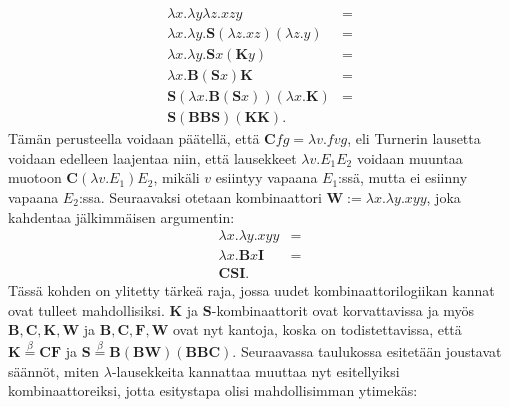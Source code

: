 \documentclass[a4paper,12pt]{amsart}
\begin{document}
\begin{equation}
\begin{split}
\lambda x.\lambda y\lambda z.xzy &= \\
\lambda x.\lambda y.\mathbf{S}(\lambda z.xz)(\lambda z.y) &= \\
\lambda x.\lambda y.\mathbf{S}x(\mathbf{K}y) &= \\
\lambda x.\mathbf{B}(\mathbf{S}x)\mathbf{K} &= \\
\mathbf{S}(\lambda x.\mathbf{B}(\mathbf{S}x))(\lambda x.\mathbf{K}) &= \\
\mathbf{S(BBS)(KK)}.
\end{split}
\end{equation}
Tämän perusteella voidaan päätellä, että $\mathbf{C}fg=\lambda v.fvg$, eli Turnerin lausetta voidaan edelleen laajentaa niin, että lausekkeet $\lambda v.E_1 E_2$ voidaan muuntaa muotoon $\mathbf{C}(\lambda v.E_1)E_2$, mikäli $v$ esiintyy vapaana $E_1$:ssä, mutta ei esiinny vapaana $E_2$:ssa. Seuraavaksi otetaan kombinaattori $\mathbf{W}:=\lambda x.\lambda y.xyy$, joka kahdentaa jälkimmäisen argumentin:
\begin{equation}
\begin{split}
\lambda x.\lambda y.xyy &= \\
\lambda x.\mathbf{B}x\mathbf{I} &= \\
\mathbf{CSI}.
\end{split}
\end{equation}
Tässä kohden on ylitetty tärkeä raja, jossa uudet kombinaattorilogiikan kannat ovat tulleet mahdollisiksi. $\mathbf{K}$ ja $\mathbf{S}$-kombinaattorit ovat korvattavissa ja myös $\mathbf{B,C,K,W}$ ja $\mathbf{B,C,F,W}$ ovat nyt kantoja, koska on todistettavissa, että $\mathbf{K}\stackrel{\beta}{=}\mathbf{CF}$ ja $\mathbf{S}\stackrel{\beta}{=}\mathbf{B(BW)(BBC)}$. Seuraavassa taulukossa esitetään joustavat säännöt, miten $\lambda$-lausekkeita kannattaa muuttaa nyt esitellyiksi kombinaattoreiksi, jotta esitystapa olisi mahdollisimman ytimekäs:
\end{document}
